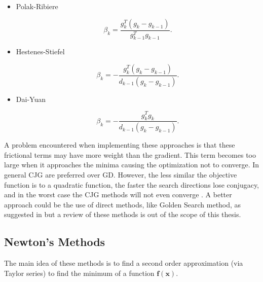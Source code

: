 \begin{itemize}
	\item Polak-Ribiere
	
	\begin{equation}
	\beta_k = \frac{ g_k^{T} (g_k - g_{k-1})}{ g_{k-1}^{T} g_{k-1}}	.
	\end{equation}
	
	\item Hestenes-Stiefel
	
	\begin{equation}
	\beta_k = - \frac{ g_k^{T} (g_k - g_{k-1})}{d_{k-1} (g_k - g_{k-1})}	.
	\end{equation}	
	
	\item Dai-Yuan
	
	\begin{equation}
	\beta_k =- \frac{ g_k^{T} g_k }{d_{k-1} (g_k - g_{k-1})}		.
	\end{equation}
	
	
\end{itemize}






A problem encountered when implementing these approaches is that these frictional terms may have more weight than the gradient. This term becomes too large when it approaches the minima causing the optimization not to converge. In general  CJG are preferred over  GD. However, the less similar the objective function is to a quadratic function, the faster the search directions lose conjugacy, and in the worst case the CJG methods will not even converge \cite{trond}. A better approach could be the use of direct methods, like Golden Search method, as suggested in \cite{CGD_converge} but a review of these methods is out of the scope of this thesis.











\subsection{Newton's Methods}
\label{subsec:newton}



The main idea of these methods is to find a second order approximation (via Taylor series) to find the minimum of a function $\mathbf{f(x)}$.


